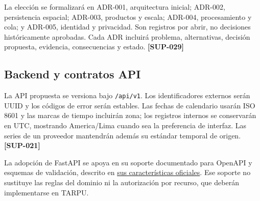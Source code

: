 \documentclass[10pt,a4paper]{article}
\begin{document}
La elección se formalizará en ADR-001, arquitectura inicial; ADR-002, persistencia espacial; ADR-003, productos y escala; ADR-004, procesamiento y cola; y ADR-005, identidad y privacidad. Son registros por abrir, no decisiones históricamente aprobadas. Cada ADR incluirá problema, alternativas, decisión propuesta, evidencia, consecuencias y estado. \textbf{[SUP-029]}


\subsection{Backend y contratos API}

La API propuesta se versiona bajo \texttt{/\allowbreak{}api/\allowbreak{}v1}. Los identificadores externos serán UUID y los códigos de error serán estables. Las fechas de calendario usarán ISO 8601 y las marcas de tiempo incluirán zona; los registros internos se conservarán en UTC, mostrando America/\allowbreak{}Lima cuando sea la preferencia de interfaz. Las series de un proveedor mantendrán además su estándar temporal de origen. \textbf{[SUP-021]}


La adopción de FastAPI se apoya en su soporte documentado para OpenAPI y esquemas de validación, descrito en \href{https://fastapi.tiangolo.com/features/}{sus características oficiales}. Ese soporte no sustituye las reglas del dominio ni la autorización por recurso, que deberán implementarse en TARPU.
\end{document}
